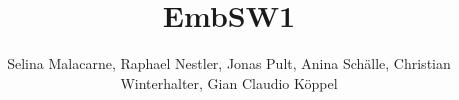 \documentclass[titlepage=true]{scrartcl}
\title{EmbSW1}
\author{Selina Malacarne, Raphael Nestler, Jonas Pult, Anina Schälle, Christian
Winterhalter, Gian Claudio Köppel}
\begin{document}
\begin{titlepage}
   \thispagestyle{empty}
   \maketitle
\end{titlepage}

\lstset{style=Cpp}

\tableofcontents \newpage














\end{document}
